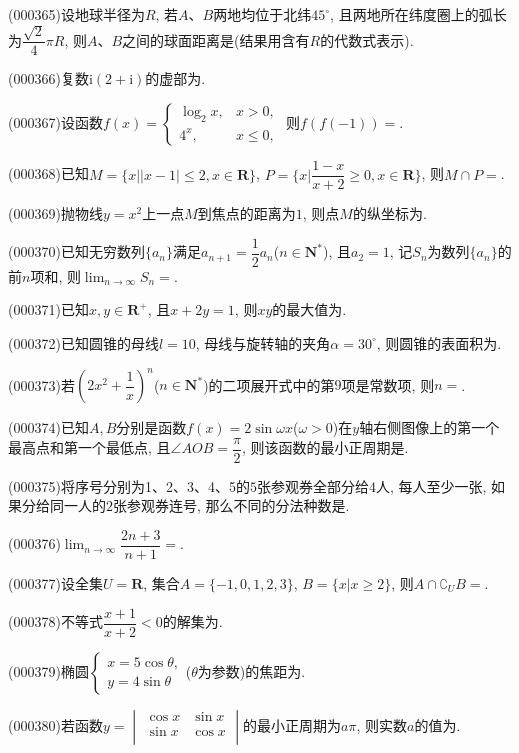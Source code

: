 \item (000365)设地球半径为$R$, 若$A$、$B$两地均位于北纬$45^\circ$, 且两地所在纬度圈上的弧长为$\dfrac{\sqrt{2}}{4}\pi R$, 则$A$、$B$之间的球面距离是(结果用含有$R$的代数式表示).
\item (000366)复数$\mathrm{i}(2+\mathrm{i})$的虚部为.
\item (000367)设函数$f(x)=\begin{cases}\log_2 x, & x>0, \\ 4^x, & x\le 0,\end{cases}$ 则$f(f(-1))=$.
\item (000368)已知$M=\{x||x-1|\le 2,x\in \mathbf{R}\}$, $P=\{x|\dfrac{1-x}{x+2}\ge 0,x\in \mathbf{R}\}$, 则$M\cap P=$.
\item (000369)抛物线$y=x^2$上一点$M$到焦点的距离为$1$, 则点$M$的纵坐标为.
\item (000370)已知无穷数列$\{a_n\}$满足$a_{n+1}=\dfrac12{a_n}$($n\in \mathbf{N}^*$), 且$a_2=1$, 记$S_n$为数列$\{a_n\}$的前$n$项和, 则$\displaystyle\lim_{n\to \infty}S_n=$.
\item (000371)已知$x,y\in \mathbf{R}^+$, 且$x+2y=1$, 则$xy$的最大值为.
\item (000372)已知圆锥的母线$l=10$, 母线与旋转轴的夹角$\alpha =30^\circ$, 则圆锥的表面积为.
\item (000373)若$(2x^2+\dfrac1x)^n$($n\in \mathbf{N}^*$)的二项展开式中的第$9$项是常数项, 则$n=$.
\item (000374)已知$A,B$分别是函数$f(x)=2\sin \omega x$($\omega >0$)在$y$轴右侧图像上的第一个最高点和第一个最低点, 且$\angle AOB=\dfrac\pi 2$, 则该函数的最小正周期是.
\item (000375)将序号分别为1、2、3、4、5的$5$张参观券全部分给$4$人, 每人至少一张, 如果分给同一人的$2$张参观券连号, 那么不同的分法种数是.
\item (000376)$\displaystyle\lim_{n\to\infty}\dfrac{2n+3}{n+1}=$.
\item (000377)设全集$U=\mathbf{R}$, 集合$A=\{-1,0,1,2,3\}$, $B=\{x|x\ge 2\}$, 则$A\cap {\complement_U}B=$.
\item (000378)不等式$\dfrac{x+1}{x+2}<0$的解集为.
\item (000379)椭圆$\begin{cases} x=5\cos \theta,  \\ y=4\sin \theta  \end{cases}$($\theta$为参数)的焦距为.
\item (000380)若函数$y=\begin{vmatrix}   \cos x & \sin x  \\   \sin x & \cos x  \\ \end{vmatrix}$的最小正周期为$a\pi $, 则实数$a$的值为.
